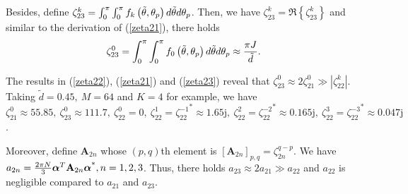 \documentclass[12pt, draftclsnofoot, onecolumn]{IEEEtran}
\begin{document}
Besides, define $\zeta _{23}^{k}=\int_{0}^{ \rm{\pi} }{\int_{0}^{ \rm{\pi} }{{{f}_{k}}\left( \tilde{\theta },{{\theta }_{p}} \right)d\tilde{\theta }}d{{\theta }_{p}}}$. Then, we have $\zeta _{23}^{k}=\Re \left\{ \zeta _{23}^{k} \right\}$ and similar to the derivation of (\ref{zeta21}), there holds
\begin{align}\label{zeta23}
  \zeta _{23}^{0}=\int_{0}^{ \rm{\pi} }{\int_{0}^{ \rm{\pi} }{{{f}_{0}}\left( \tilde{\theta },{{\theta }_{p}} \right)d\tilde{\theta }}d{{\theta }_{p}}} \approx \frac{{ \rm{\pi} }J}{\tilde{d}}.
\end{align}

The results in (\ref{zeta22}), (\ref{zeta21}) and (\ref{zeta23}) reveal that $\zeta _{23}^{0}\approx 2\zeta _{21}^{0}\gg \left| \zeta _{22}^{k} \right|$. Taking $\tilde{d}=0.45,\ M=64$ and $K=4$ for example, we  have $\zeta _{21}^{0}\approx 55.85,\ \zeta _{23}^{0}\approx 111.7,\ \zeta _{22}^{0}=0,\ \zeta _{22}^{1} = {\zeta _{22}^{-1}}^{*}\approx 1.65\text{j},\ \zeta _{22}^{2} = {\zeta _{22}^{-2}}^{*} \approx 0.165\text{j},\ \zeta _{22}^{3} = {\zeta _{22}^{-3}}^{*} \approx 0.047\text{j}$.

Moreover, define ${\mathbf{A}}_{2n}$ whose $(p,q)$th element is $[{\mathbf{A}}_{2n}]_{p,q} = \zeta _{2n}^{q-p}$. We have ${{a}_{2n}}=\frac{2{\rm{\pi}}N}{3}{{\boldsymbol{\alpha }}^{T}} \mathbf{A}_{2n} {{\boldsymbol{\alpha }}^{\text{*}}}, \\ n=1,2,3 $.
Thus, there holds ${{a}_{23}} \approx 2{{a}_{21}}\gg {{a}_{22}}$ and ${a}_{22}$ is negligible compared to ${{a}_{21}}$ and ${{a}_{23}}$.
\end{document}
